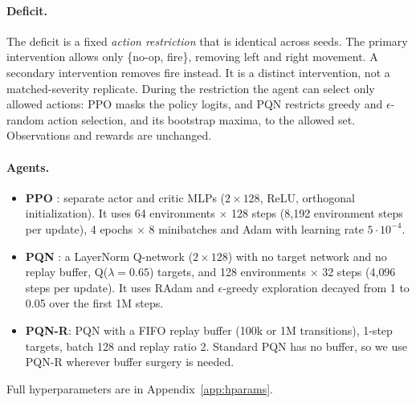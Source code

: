 \documentclass[10pt]{article} %
\begin{document}
\paragraph{Deficit.}
The deficit is a fixed \emph{action restriction} that is identical across seeds. The primary intervention allows only \{no-op, fire\}, removing left and right movement. A secondary intervention removes fire instead. It is a distinct intervention, not a matched-severity replicate. During the restriction the agent can select only allowed actions: PPO masks the policy logits, and PQN restricts greedy and $\epsilon$-random action selection, and its bootstrap maxima, to the allowed set. Observations and rewards are unchanged.

\paragraph{Agents.}
\begin{itemize}
\item \textbf{PPO} \citep{schulman2017ppo}: separate actor and critic MLPs ($2\times128$, ReLU, orthogonal initialization). It uses 64 environments $\times$ 128 steps (8{,}192 environment steps per update), 4 epochs $\times$ 8 minibatches and Adam with learning rate $5\cdot10^{-4}$.
\item \textbf{PQN} \citep{gallici2025pqn}: a LayerNorm Q-network ($2\times128$) with no target network and no replay buffer, Q($\lambda{=}0.65$) targets, and 128 environments $\times$ 32 steps (4{,}096 steps per update). It uses RAdam \citep{liu2019radam} and $\epsilon$-greedy exploration decayed from 1 to 0.05 over the first 1M steps.
\item \textbf{PQN-R}: PQN with a FIFO replay buffer (100k or 1M transitions), 1-step targets, batch 128 and replay ratio 2. Standard PQN has no buffer, so we use PQN-R wherever buffer surgery is needed.
\end{itemize}
Full hyperparameters are in Appendix~\ref{app:hparams}.
\end{document}
